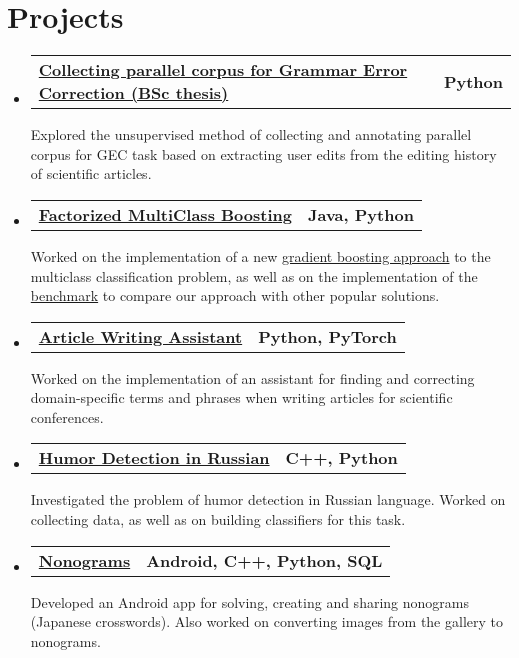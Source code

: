 \documentclass[letterpaper,11pt]{article}
\makeatletter
\newcommand{\simpleItemHeading}[2]{
  \vspace{-1pt}\item
    \begin{tabular*}{0.97\textwidth}[t]{l@{\extracolsep{\fill}}r}
      {\large #1} & #2 \\
    \end{tabular*}\vspace{-5pt}
}
\makeatother
\begin{document}
\section{Projects}
  \begin{itemize}[leftmargin=*]
    \simpleItemHeading{\href{https://spb.hse.ru/en/ba/appmath/students/diplomas/368409397}{\textbf{Collecting parallel corpus for Grammar Error Correction (BSc thesis)}}}{\textbf{Python}}
    
    Explored the unsupervised method of collecting and annotating parallel corpus for GEC task based on extracting user edits from the editing history of scientific articles.
    
    \vspace{-5pt}
  
    \simpleItemHeading{\href{https://arxiv.org/abs/1909.04904}{\textbf{Factorized MultiClass Boosting}}}{\textbf{Java, Python}}
    
    Worked on the implementation of a new \href{https://github.com/spbsu-ml-community/jmll/blob/master/experiments/src/main/java/com/expleague/fmcb/FMCBoostingMain.java}{gradient boosting approach} to the multiclass classification problem, as well as on the implementation of the \href{https://github.com/rebryk/mcc-benchmark}{benchmark} to compare our approach with other popular solutions.
    
    \vspace{-5pt}
    
    \simpleItemHeading{\href{https://github.com/AntonYermilov/article-writing-assistant/}{\textbf{Article Writing Assistant}}}{\textbf{Python, PyTorch}}
    
    Worked on the implementation of an assistant for finding and correcting domain-specific terms and phrases when writing articles for scientific conferences.
    
    \vspace{-5pt}
    
    \simpleItemHeading{\href{https://github.com/AntonYermilov/pun-detection-and-generation}{\textbf{Humor Detection in Russian}}}{\textbf{C++, Python}}
    
    Investigated the problem of humor detection in Russian language. Worked on collecting data, as well as on building classifiers for this task.
    
    \vspace{-5pt}
    
    \simpleItemHeading{\href{https://github.com/AntonYermilov/Nonogram-Android}{\textbf{Nonograms}}}{\textbf{Android, C++, Python, SQL}}
    
    Developed an Android app for solving, creating and sharing nonograms (Japanese crosswords). Also worked on converting images from the gallery to nonograms.
  \end{itemize}
\end{document}
